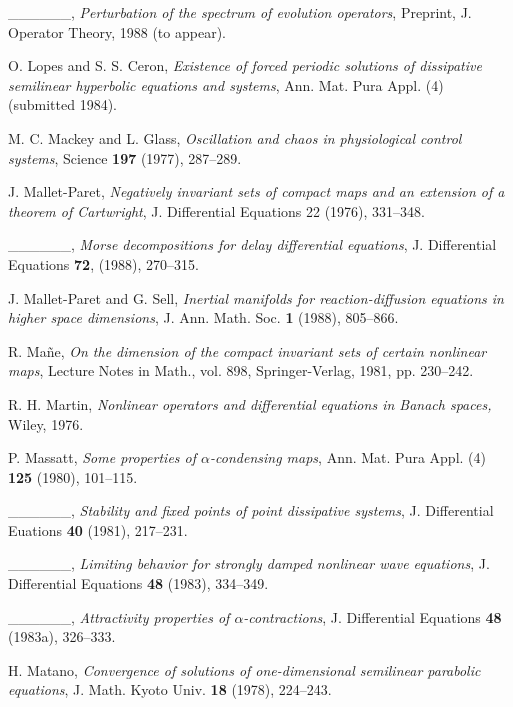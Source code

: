 \documentclass{surv-l}
\theoremstyle{plain}
\theoremstyle{definition}
\numberwithin{equation}{section}
\numberwithin{figure}{chapter}
\begin{document}
\begin{thebibliography}{}
 \_\_\_\_\_\_, \emph{Perturbation of the spectrum of evolution operators}, Preprint, J. Operator Theory, 1988 (to appear).

O. Lopes and S. S. Ceron, \emph{Existence of forced periodic solutions of dissipative semilinear hyperbolic equations and systems}, Ann. Mat. Pura Appl. (4) (submitted 1984).

M. C. Mackey and L. Glass, \emph{Oscillation and chaos in physiological control systems}, Science \textbf{197} (1977), 287--289.

J. Mallet-Paret, \emph{Negatively invariant sets of compact maps and an extension of a theorem of Cartwright}, J. Differential Equations 22 (1976), 331--348.

 \_\_\_\_\_\_, \emph{Morse decompositions for delay differential equations}, J. Differential Equations \textbf{72}, (1988), 270--315.

J. Mallet-Paret and G. Sell, \emph{Inertial manifolds for reaction-diffusion equations in higher space dimensions}, J. Ann. Math. Soc. \textbf{1} (1988), 805--866.

R. Ma\~{n}e, \emph{On the dimension of the compact invariant sets of certain nonlinear maps}, Lecture Notes in Math., vol. 898, Springer-Verlag, 1981, pp. 230--242.

R. H. Martin, \emph{Nonlinear operators and differential equations in Banach spaces,}
Wiley, 1976.

P. Massatt, \emph{Some properties of $\alpha$-condensing maps}, Ann. Mat. Pura Appl. (4) \textbf{125} (1980), 101--115.

 \_\_\_\_\_\_, \emph{Stability and fixed points of point dissipative systems}, J. Differential Euations \textbf{40} (1981), 217--231.

 \_\_\_\_\_\_, \emph{Limiting behavior for strongly damped nonlinear wave equations}, J. Differential Equations \textbf{48} (1983), 334--349.

 \_\_\_\_\_\_, \emph{Attractivity properties of $\alpha$-contractions}, J. Differential Equations \textbf{48} (1983a), 326--333.

H. Matano, \emph{Convergence of solutions of one-dimensional semilinear parabolic}
\emph{equations}, J. Math. Kyoto Univ. \textbf{18} (1978), 224--243.


\end{thebibliography}
\end{document}
